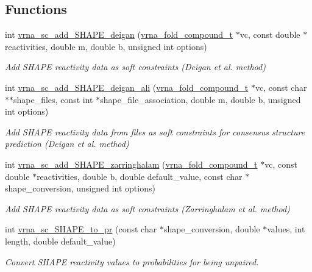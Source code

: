 \subsection*{Functions}
\begin{DoxyCompactItemize}
\item 
int \hyperlink{group__SHAPE__reactivities_ga57d612b58e1c61dd6cfcb5a843f8f1b3}{vrna\+\_\+sc\+\_\+add\+\_\+\+S\+H\+A\+P\+E\+\_\+deigan} (\hyperlink{group__fold__compound_ga1b0cef17fd40466cef5968eaeeff6166}{vrna\+\_\+fold\+\_\+compound\+\_\+t} $\ast$vc, const double $\ast$reactivities, double m, double b, unsigned int options)
\begin{DoxyCompactList}\small\item\em Add S\+H\+A\+P\+E reactivity data as soft constraints (Deigan et al. method) \end{DoxyCompactList}\item 
int \hyperlink{group__SHAPE__reactivities_ga04ba85da63d8c793bb8001d1e6f800ba}{vrna\+\_\+sc\+\_\+add\+\_\+\+S\+H\+A\+P\+E\+\_\+deigan\+\_\+ali} (\hyperlink{group__fold__compound_ga1b0cef17fd40466cef5968eaeeff6166}{vrna\+\_\+fold\+\_\+compound\+\_\+t} $\ast$vc, const char $\ast$$\ast$shape\+\_\+files, const int $\ast$shape\+\_\+file\+\_\+association, double m, double b, unsigned int options)
\begin{DoxyCompactList}\small\item\em Add S\+H\+A\+P\+E reactivity data from files as soft constraints for consensus structure prediction (Deigan et al. method) \end{DoxyCompactList}\item 
int \hyperlink{group__SHAPE__reactivities_gaf3c65a045060aef5c4e41693d30af58c}{vrna\+\_\+sc\+\_\+add\+\_\+\+S\+H\+A\+P\+E\+\_\+zarringhalam} (\hyperlink{group__fold__compound_ga1b0cef17fd40466cef5968eaeeff6166}{vrna\+\_\+fold\+\_\+compound\+\_\+t} $\ast$vc, const double $\ast$reactivities, double b, double default\+\_\+value, const char $\ast$shape\+\_\+conversion, unsigned int options)
\begin{DoxyCompactList}\small\item\em Add S\+H\+A\+P\+E reactivity data as soft constraints (Zarringhalam et al. method) \end{DoxyCompactList}\item 
int \hyperlink{group__SHAPE__reactivities_ga67675b3ed48744489a3bcfa4174197cb}{vrna\+\_\+sc\+\_\+\+S\+H\+A\+P\+E\+\_\+to\+\_\+pr} (const char $\ast$shape\+\_\+conversion, double $\ast$values, int length, double default\+\_\+value)
\begin{DoxyCompactList}\small\item\em Convert S\+H\+A\+P\+E reactivity values to probabilities for being unpaired. \end{DoxyCompactList}\end{DoxyCompactItemize}


